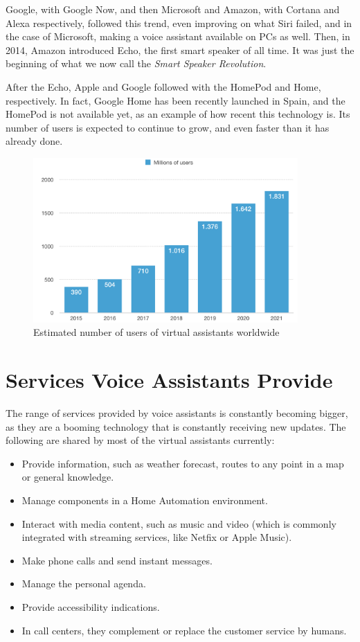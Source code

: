 Google, with Google Now, and then Microsoft and Amazon, with Cortana and Alexa respectively, followed this trend, even improving
on what Siri failed, and in the case of Microsoft, making a voice assistant available on PCs as well. Then, in 2014, Amazon introduced
Echo, the first smart speaker of all time. It was just the beginning of what we now call the \textit{Smart Speaker Revolution}.\cite{voicebotTimeline}

After the Echo, Apple and Google followed with the HomePod and Home, respectively. In fact, Google Home has been recently
launched in Spain, and the HomePod is not available yet, as an example of how recent this technology is. Its number of users is
expected to continue to grow, and even faster than it has already done.\cite{statistaDigitalAssistants}

\begin{figure}
	\centering
	\includegraphics[width=0.9\textwidth]{images/Chapter_04/voice-assistants-usage.png}
	\caption{Estimated number of users of virtual assistants worldwide \cite{statistaDigitalAssistants}}
	\label{fig:voice-assistants-usage}
\end{figure}

\bigskip
\section{Services Voice Assistants Provide}
The range of services provided by voice assistants is constantly becoming bigger, as they are a booming technology that is constantly
receiving new updates. The following are shared by most of the virtual assistants currently:
\begin{itemize}
	\item Provide information, such as weather forecast, routes to any point in a map or general knowledge.
	\item Manage components in a Home Automation environment.
	\item Interact with media content, such as music and video (which is commonly integrated with streaming services, like Netfix or
	Apple Music).
	\item Make phone calls and send instant messages.
	\item Manage the personal agenda.
	\item Provide accessibility indications.
	\item In call centers, they complement or replace the customer service by humans.
\end{itemize}

